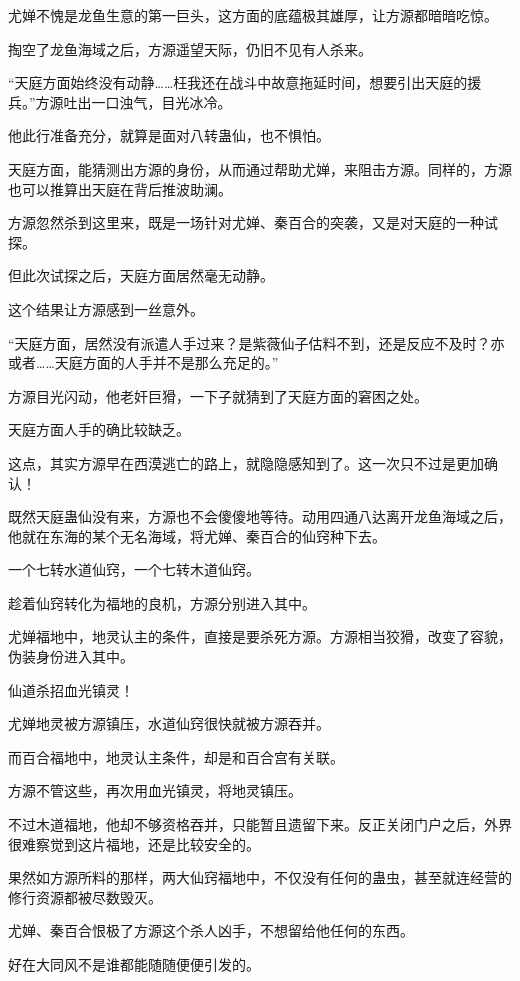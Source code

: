 \begin{this_body}
尤婵不愧是龙鱼生意的第一巨头，这方面的底蕴极其雄厚，让方源都暗暗吃惊。

掏空了龙鱼海域之后，方源遥望天际，仍旧不见有人杀来。

“天庭方面始终没有动静……枉我还在战斗中故意拖延时间，想要引出天庭的援兵。”方源吐出一口浊气，目光冰冷。

他此行准备充分，就算是面对八转蛊仙，也不惧怕。

天庭方面，能猜测出方源的身份，从而通过帮助尤婵，来阻击方源。同样的，方源也可以推算出天庭在背后推波助澜。

方源忽然杀到这里来，既是一场针对尤婵、秦百合的突袭，又是对天庭的一种试探。

但此次试探之后，天庭方面居然毫无动静。

这个结果让方源感到一丝意外。

“天庭方面，居然没有派遣人手过来？是紫薇仙子估料不到，还是反应不及时？亦或者……天庭方面的人手并不是那么充足的。”

方源目光闪动，他老奸巨猾，一下子就猜到了天庭方面的窘困之处。

天庭方面人手的确比较缺乏。

这点，其实方源早在西漠逃亡的路上，就隐隐感知到了。这一次只不过是更加确认！

既然天庭蛊仙没有来，方源也不会傻傻地等待。动用四通八达离开龙鱼海域之后，他就在东海的某个无名海域，将尤婵、秦百合的仙窍种下去。

一个七转水道仙窍，一个七转木道仙窍。

趁着仙窍转化为福地的良机，方源分别进入其中。

尤婵福地中，地灵认主的条件，直接是要杀死方源。方源相当狡猾，改变了容貌，伪装身份进入其中。

仙道杀招血光镇灵！

尤婵地灵被方源镇压，水道仙窍很快就被方源吞并。

而百合福地中，地灵认主条件，却是和百合宫有关联。

方源不管这些，再次用血光镇灵，将地灵镇压。

不过木道福地，他却不够资格吞并，只能暂且遗留下来。反正关闭门户之后，外界很难察觉到这片福地，还是比较安全的。

果然如方源所料的那样，两大仙窍福地中，不仅没有任何的蛊虫，甚至就连经营的修行资源都被尽数毁灭。

尤婵、秦百合恨极了方源这个杀人凶手，不想留给他任何的东西。

好在大同风不是谁都能随随便便引发的。


\end{this_body}
